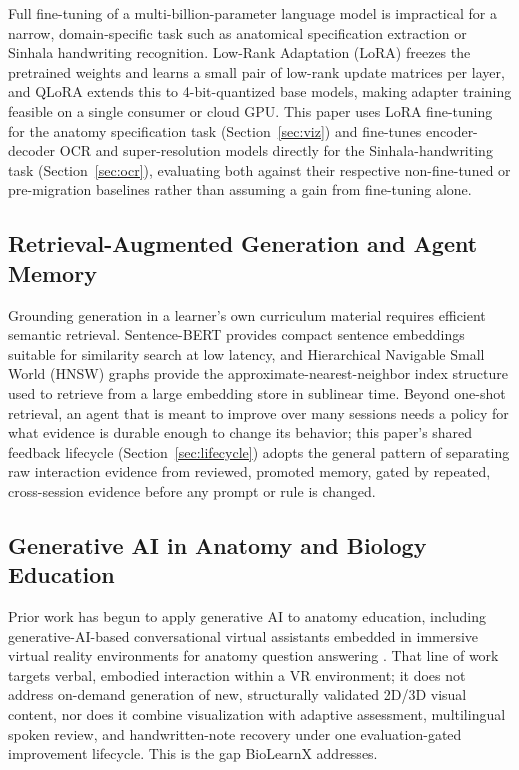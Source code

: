 \documentclass[conference]{IEEEtran}
\begin{document}
Full fine-tuning of a multi-billion-parameter language model is impractical for a narrow, domain-specific task such as anatomical specification extraction or Sinhala handwriting recognition. Low-Rank Adaptation (LoRA) \cite{lora} freezes the pretrained weights and learns a small pair of low-rank update matrices per layer, and QLoRA \cite{qlora} extends this to 4-bit-quantized base models, making adapter training feasible on a single consumer or cloud GPU. This paper uses LoRA fine-tuning for the anatomy specification task (Section~\ref{sec:viz}) and fine-tunes encoder-decoder OCR and super-resolution models directly for the Sinhala-handwriting task (Section~\ref{sec:ocr}), evaluating both against their respective non-fine-tuned or pre-migration baselines rather than assuming a gain from fine-tuning alone.

\subsection{Retrieval-Augmented Generation and Agent Memory}

Grounding generation in a learner's own curriculum material requires efficient semantic retrieval. Sentence-BERT \cite{sbert} provides compact sentence embeddings suitable for similarity search at low latency, and Hierarchical Navigable Small World (HNSW) graphs \cite{hnsw} provide the approximate-nearest-neighbor index structure used to retrieve from a large embedding store in sublinear time. Beyond one-shot retrieval, an agent that is meant to improve over many sessions needs a policy for what evidence is durable enough to change its behavior; this paper's shared feedback lifecycle (Section~\ref{sec:lifecycle}) adopts the general pattern of separating raw interaction evidence from reviewed, promoted memory, gated by repeated, cross-session evidence before any prompt or rule is changed.

\subsection{Generative AI in Anatomy and Biology Education}

Prior work has begun to apply generative AI to anatomy education, including generative-AI-based conversational virtual assistants embedded in immersive virtual reality environments for anatomy question answering \cite{anatomyvr}. That line of work targets verbal, embodied interaction within a VR environment; it does not address on-demand generation of new, structurally validated 2D/3D visual content, nor does it combine visualization with adaptive assessment, multilingual spoken review, and handwritten-note recovery under one evaluation-gated improvement lifecycle. This is the gap BioLearnX addresses.
\end{document}

